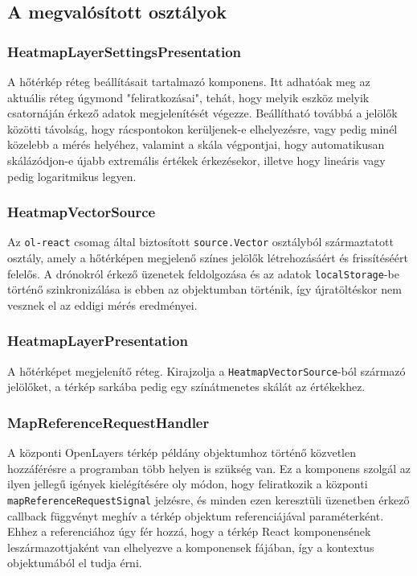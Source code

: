 \subsection{A megvalósított osztályok}

\subsubsection{HeatmapLayerSettingsPresentation}
A hőtérkép réteg beállításait tartalmazó komponens.
Itt adhatóak meg az aktuális réteg úgymond "feliratkozásai", tehát, hogy melyik
eszköz melyik csatornáján érkező adatok megjelenítését végezze.
Beállítható továbbá a jelölők közötti távolság, hogy rácspontokon kerüljenek-e
elhelyezésre, vagy pedig minél közelebb a mérés helyéhez, valamint a skála
végpontjai, hogy automatikusan skálázódjon-e újabb extremális értékek
érkezésekor, illetve hogy lineáris vagy pedig logaritmikus legyen.

\subsubsection{HeatmapVectorSource}
Az \verb|ol-react| csomag által biztosított \verb|source.Vector| osztályból
származtatott osztály, amely a hőtérképen megjelenő színes jelölők
létrehozásáért és frissítéséért felelős.
A drónokról érkező üzenetek feldolgozása és az adatok \verb|localStorage|-be
történő szinkronizálása is ebben az objektumban történik, így újratöltéskor nem
vesznek el az eddigi mérés eredményei.

\subsubsection{HeatmapLayerPresentation}
A hőtérképet megjelenítő réteg. Kirajzolja a \verb|HeatmapVectorSource|-ból
származó jelölőket, a térkép sarkába pedig egy színátmenetes skálát az
értékekhez.

\subsubsection{MapReferenceRequestHandler}
A központi OpenLayers térkép példány objektumhoz történő közvetlen hozzáférésre
a programban több helyen is szükség van. Ez a komponens szolgál az ilyen jellegű
igények kielégítésére oly módon, hogy feliratkozik a központi
\verb|mapReferenceRequestSignal| jelzésre, és minden ezen keresztüli üzenetben
érkező callback függvényt meghív a térkép objektum referenciájával
paraméterként. Ehhez a referenciához úgy fér hozzá, hogy a térkép React
komponensének leszármazottjaként van elhelyezve a komponensek fájában, így a
kontextus objektumából el tudja érni.

